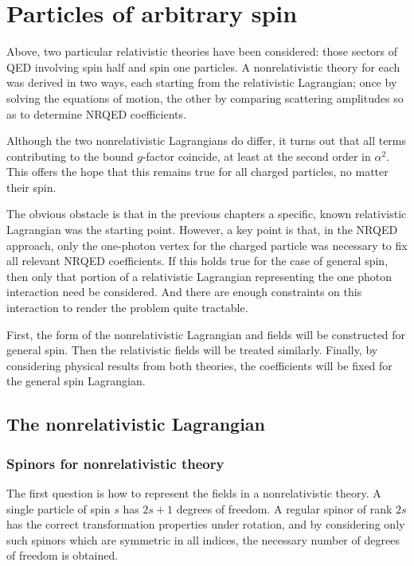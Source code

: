 
\chapter{Particles of arbitrary spin}

Above, two particular relativistic theories have been considered: those sectors of QED involving spin half and spin one particles.  A nonrelativistic theory for each was derived in two ways, each starting from the relativistic Lagrangian; once by solving the equations of motion, the other by comparing scattering amplitudes so as to determine NRQED coefficients.

Although the two nonrelativistic Lagrangians do differ, it turns out that all terms contributing to the bound $g$-factor coincide, at least at the second order in $\alpha^2$.  This offers the hope that this remains true for all charged particles, no matter their spin.

The obvious obstacle is that in the previous chapters a specific, known relativistic Lagrangian was the starting point.  However, a key point is that, in the NRQED approach, only the one-photon vertex for the charged particle was necessary to fix all relevant NRQED coefficients.  If this holds true for the case of general spin, then only that portion of a relativistic Lagrangian representing the one photon interaction need be considered.  And there are enough constraints on this interaction to render the problem quite tractable.

First, the form of the nonrelativistic Lagrangian and fields will be constructed for general spin.  Then the relativistic fields will be treated similarly.  Finally, by considering physical results from both theories, the coefficients will be fixed for the general spin Lagrangian.



\section{The nonrelativistic Lagrangian}
\subsection{Spinors for nonrelativistic theory}
The first question is how to represent the fields in a nonrelativistic theory.  A single particle of spin $s$ has $2s+1$ degrees of freedom.  A regular spinor of rank $2s$ has the correct transformation properties under rotation, and by considering only such spinors which are symmetric in all indices, the necessary number of degrees of freedom is obtained.


